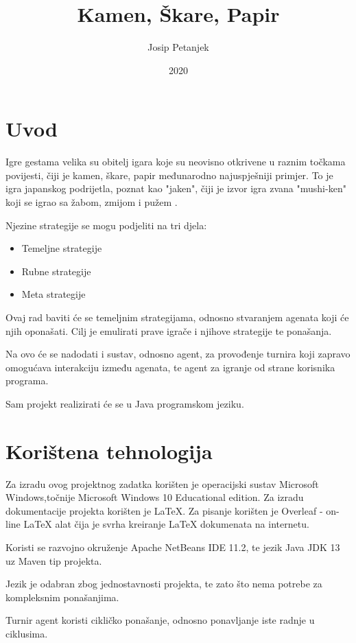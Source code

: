\documentclass{foi}
\title{Kamen, Škare, Papir}
\author{Josip Petanjek}
\date{2020}
\begin{document}
\maketitle

\tableofcontents

\pagestyle{plain}
\chapter{Uvod}

Igre gestama velika su obitelj igara koje su neovisno otkrivene u raznim točkama povijesti, čiji je kamen, škare, papir međunarodno najuspješniji primjer. To je igra japanskog podrijetla, poznat kao "jaken", čiji je izvor igra zvana "mushi-ken" koji se igrao sa žabom, zmijom i pužem \cite{towardsAI2020}.

Njezine strategije se mogu podjeliti na tri djela:
\begin{itemize}
    \item Temeljne strategije
    \item Rubne strategije
    \item Meta strategije
\end{itemize}
Ovaj rad baviti će se temeljnim strategijama, odnosno stvaranjem agenata koji će njih oponašati.
Cilj je emulirati prave igrače i njihove strategije te ponašanja.

Na ovo će se nadodati i sustav, odnosno agent, za provođenje turnira koji zapravo omogućava interakciju između agenata, te agent za igranje od strane korisnika programa.


Sam projekt realizirati će se u Java programskom jeziku.

\chapter{Korištena tehnologija}
Za izradu ovog projektnog zadatka korišten je operacijski sustav Microsoft Windows,točnije Microsoft Windows 10 Educational edition.
Za izradu dokumentacije projekta korišten je LaTeX. Za pisanje korišten je Overleaf - on-line LaTeX alat čija je svrha kreiranje LaTeX dokumenata na internetu. 

Koristi se razvojno okruženje Apache NetBeans IDE 11.2, te jezik Java JDK 13 uz Maven tip projekta.

Jezik je odabran zbog jednostavnosti projekta, te zato što nema potrebe za kompleksnim ponašanjima.

Turnir agent koristi cikličko ponašanje, odnosno ponavljanje iste radnje u ciklusima.
\end{document}
